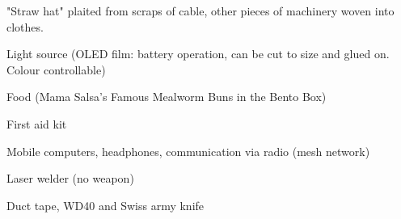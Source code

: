 \newpage
\begin{npcBox}[title=Spark continued]
    \begin{npcDescription}
    "Straw hat" plaited from scraps of cable, other pieces of machinery woven into clothes.
    \end{npcDescription}


    \begin{equipment}
    \item Light source (OLED film: battery operation, can be cut to size and glued on. Colour controllable)
    \item Food (Mama Salsa's Famous Mealworm Buns in the Bento Box)
    \item First aid kit
    \item Mobile computers, headphones, communication via radio (mesh network)
    \item Laser welder (no weapon)
    \item Duct tape, WD40 and Swiss army knife
    \end{equipment}
\end{npcBox}